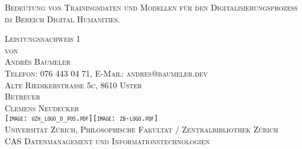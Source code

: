 

\begin{titlepage}

\begin{center}
\Large
\textsc{Bedeutung von Trainingsdaten und Modellen für den Digitalisierungsprozess im Bereich Digital Humanities.}\\

\vspace{2cm}

\textsc{Leistungsnachweis 1\\[0.5\baselineskip]
 von\\[0.5\baselineskip]
Andrés Baumeler\\
{\normalsize \textsc{Telefon: 076 443 04 71, E-Mail: andres@baumeler.dev }}\\
{\normalsize \textsc{Alte Riedikerstrasse 5c, 8610 Uster}}}\\


\vspace{3cm}
\textsc{Betreuer\\
Clemens Neudecker}\\

\vspace{2cm}
\textsc{ \texttt{[image: uzh\_logo\_d\_pos.pdf]}\hspace{1cm}\texttt{[image: zb-logo.pdf]} \\
\normalsize{Universität Zürich, Philosophische Fakultät  / Zentralbibliothek Zürich}\\
\normalsize{CAS Datenmanagement und Informationstechnologien}}\\

\end{center}

\end{titlepage}
